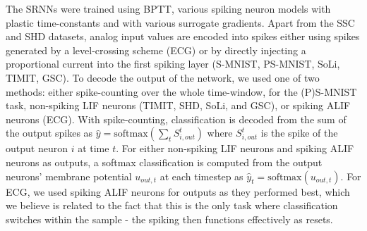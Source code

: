 \documentclass[fleqn,10pt]{wlscirep}
\begin{document}
The SRNNs were trained using BPTT, various spiking neuron models with plastic time-constants and with various surrogate gradients. Apart from the SSC and SHD datasets, analog input values are encoded into spikes either using spikes generated by a level-crossing scheme (ECG) or by directly injecting a proportional current into the first spiking layer (S-MNIST, PS-MNIST, SoLi, TIMIT, GSC). To decode the output of the network, we used one of two methods: either spike-counting over the whole time-window, for the (P)S-MNIST task, non-spiking LIF neurons (TIMIT, SHD, SoLi, and GSC), or spiking ALIF neurons (ECG). With spike-counting, classification is decoded from the sum of the output spikes as $\hat{y} = \text{softmax}(\sum_t S_{i,out}^t)$ where $S_{i,out}^t$ is the spike of the output neuron $i$ at time $t$. For either non-spiking LIF neurons and spiking ALIF neurons as outputs, a softmax classification is computed from the output neurons' membrane potential $u_{out,t}$ at each timestep as $\hat{y}_t = \text{softmax}(u_{out,t})$. For ECG, we used spiking ALIF neurons for outputs as they performed best, which we believe is related to the fact that this is the only task where classification switches within the sample - the spiking then functions effectively as resets.
\end{document}
